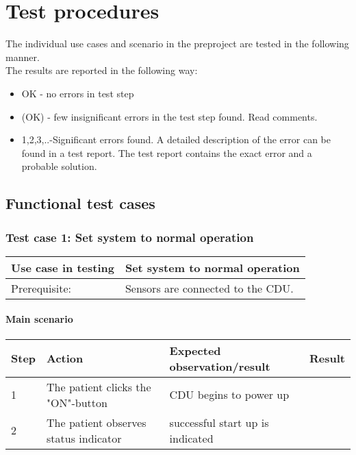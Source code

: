 \chapter{Test procedures}
The individual use cases and scenario in the %
preproject are tested in the following manner.\\

The results are reported in the following way:
\begin{itemize}[bullet]
\item OK - no errors in test step
\item (OK) - few insignificant errors in the test step found. Read comments.
\item 1,2,3,..-Significant errors found. A detailed description of  the error can be found in a test report. The test report contains the exact error and a probable solution.
\end{itemize}

\section{Functional test cases}
\subsection{Test case 1: Set system to normal operation}
\begin{table}[H]
    \begin{tabular}{|l|p{7cm}|}
    \hline
    Use case in testing & Set system to normal operation \\ \hline
    Prerequisite: & Sensors are connected to the CDU. \\ \hline
    \end{tabular}
\end{table}

\subsubsection{Main scenario}
\begin{table}[H]
    \begin{tabular}{|l|p{7cm}|p{5cm}|l|}
    \hline
    Step & Action & Expected observation/result & Result \\ \hline
    1 & The patient clicks the "ON"-button & CDU begins to power up & ~ \\ \hline
    2 & The patient observes status indicator & successful start up is indicated & ~ \\ \hline
    \end{tabular}
\end{table}

